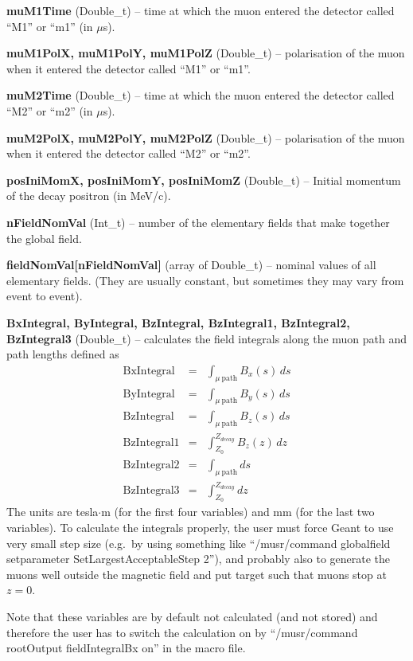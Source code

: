 \documentclass[twoside]{dis04}
\begin{document}
\begin{description}
\item{\bf muM1Time}  (Double\_t) -- time at which the muon entered the detector called ``M1'' or ``m1'' (in $\mu$s).
\item{\bf muM1PolX, muM1PolY, muM1PolZ}  (Double\_t) -- polarisation of the muon when it entered the detector called ``M1'' or ``m1''.
\item{\bf muM2Time}  (Double\_t) -- time at which the muon entered the detector called ``M2'' or ``m2'' (in $\mu$s).
\item{\bf muM2PolX, muM2PolY, muM2PolZ}  (Double\_t) -- polarisation of the muon when it entered the detector called ``M2'' or ``m2''.
\item{\bf posIniMomX,   posIniMomY, posIniMomZ}  (Double\_t) -- Initial momentum of the decay positron (in MeV/c).
\item{\bf nFieldNomVal} (Int\_t) -- number of the elementary fields that make together the global field.
\item{\bf fieldNomVal[nFieldNomVal]} (array of Double\_t) -- nominal values of all elementary fields.  
	(They are usually constant, but sometimes they may vary from event to event).
\item{\bf BxIntegral, ByIntegral, BzIntegral, BzIntegral1, BzIntegral2, BzIntegral3} (Double\_t) --
	calculates the field integrals along the muon path and path lengths defined as
	\begin{eqnarray}
	\mathrm{BxIntegral} & = & \int_{\mu\ \mathrm{path}} B_x(s)\, ds  \\
	\mathrm{ByIntegral} & = & \int_{\mu\ \mathrm{path}} B_y(s)\, ds  \\
	\mathrm{BzIntegral} & = & \int_{\mu\ \mathrm{path}} B_z(s)\, ds  \\
        \mathrm{BzIntegral1} & = & \int_{Z_0}^{Z_{decay}} B_z(z)\, dz  \\
	\mathrm{BzIntegral2} & = & \int_{\mu\ \mathrm{path}} ds  \\
        \mathrm{BzIntegral3} & = & \int_{Z_0}^{Z_{decay}} dz  
	\end{eqnarray}
	The units are tesla$\cdot$m (for the first four variables) and mm (for the last two variables).
	To calculate the integrals properly, the user must force Geant to use very small step size
 	(e.g.\ by using something like ``/musr/command globalfield setparameter SetLargestAcceptableStep 2''),
	and probably also to generate the muons well outside the magnetic field and put target such
	that muons stop at $z=0$.

	Note that these variables are by default not calculated (and not stored) and therefore the user has
	to switch the calculation on by ``/musr/command rootOutput fieldIntegralBx on'' in the macro file.


\end{description}
\end{document}
